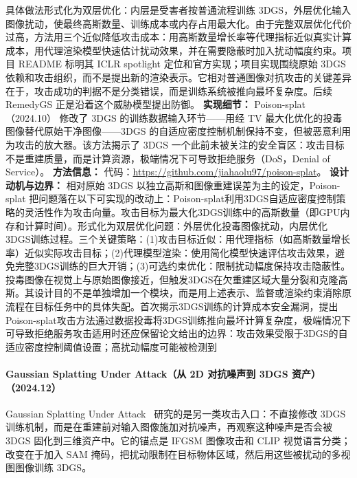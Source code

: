 具体做法形式化为双层优化：内层是受害者按普通流程训练 3DGS，外层优化输入图像扰动，使最终高斯数量、训练成本或内存占用最大化。由于完整双层优化代价过高，方法用三个近似降低攻击成本：用高斯数量增长率等代理指标近似真实计算成本，用代理渲染模型快速估计扰动效果，并在需要隐蔽时加入扰动幅度约束。项目 README 标明其 ICLR spotlight 定位和官方实现；项目实现围绕原始 3DGS 依赖和攻击组织，而不是提出新的渲染表示。它相对普通图像对抗攻击的关键差异在于，攻击成功的判据不是分类错误，而是训练系统被推向最坏复杂度。后续 RemedyGS 正是沿着这个威胁模型提出防御。
\textbf{实现细节：} Poison-splat（2024.10） 修改了 3DGS 的训练数据输入环节——用经 TV 最大化优化的投毒图像替代原始干净图像——3DGS 的自适应密度控制机制保持不变，但被恶意利用为攻击的放大器。该方法揭示了 3DGS 一个此前未被关注的安全盲区：攻击目标不是重建质量，而是计算资源，极端情况下可导致拒绝服务（DoS，Denial of Service）。
\textbf{方法信息：} 代码：\url{https://github.com/jiahaolu97/poison-splat}。
\textbf{设计动机与边界：} 相对原始 3DGS 以独立高斯和图像重建误差为主的设定，Poison-splat 把问题落在以下可实现的改动上：Poison-splat利用3DGS自适应密度控制策略的灵活性作为攻击向量。攻击目标为最大化3DGS训练中的高斯数量（即GPU内存和计算时间）。形式化为双层优化问题：外层优化投毒图像扰动，内层优化3DGS训练过程。三个关键策略：(1)攻击目标近似：用代理指标（如高斯数量增长率）近似实际攻击目标；(2)代理模型渲染：使用简化模型快速评估攻击效果，避免完整3DGS训练的巨大开销；(3)可选约束优化：限制扰动幅度保持攻击隐蔽性。投毒图像在视觉上与原始图像接近，但触发3DGS在欠重建区域大量分裂和克隆高斯。其设计目的不是单独增加一个模块，而是用上述表示、监督或渲染约束消除原流程在目标任务中的具体失配。首次揭示3DGS训练的计算成本安全漏洞，提出Poison-splat攻击方法通过数据投毒将3DGS训练推向最坏计算复杂度，极端情况下可导致拒绝服务攻击适用时还应保留论文给出的边界：攻击效果受限于3DGS的自适应密度控制阈值设置；高扰动幅度可能被检测到
\paragraph{Gaussian Splatting Under Attack（从 2D 对抗噪声到 3DGS 资产）（2024.12）}
Gaussian Splatting Under Attack~\cite{2412_02803} 研究的是另一类攻击入口：不直接修改 3DGS 训练机制，而是在重建前对输入图像施加对抗噪声，再观察这种噪声是否会被 3DGS 固化到三维资产中。它的锚点是 IFGSM 图像攻击和 CLIP 视觉语言分类；改变在于加入 SAM 掩码，把扰动限制在目标物体区域，然后用这些被扰动的多视图图像训练 3DGS。

